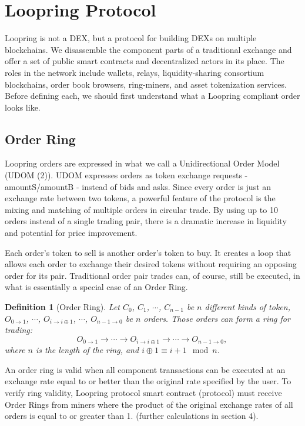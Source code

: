 \documentclass[UTF8,nofonts]{article}
\newtheorem{definition}{Definition}[section]
\begin{document}
\section{Loopring Protocol\label{sec:loopring_protocol}}
Loopring is not a DEX, but a protocol for building DEXs on multiple blockchains. We disassemble the component parts of a traditional exchange and offer a set of public smart contracts and decentralized actors in its place. The roles in the network include wallets, relays, liquidity-sharing consortium blockchains, order book browsers, ring-miners, and asset tokenization services. Before defining each, we should first understand what a Loopring compliant order looks like. 

\subsection{Order Ring}
Loopring orders are expressed in what we call a Unidirectional Order Model (UDOM (2)). UDOM expresses orders as token exchange requests - amountS/amountB - instead of bids and asks. Since every order is just an exchange rate between two tokens, a powerful feature of the protocol is the mixing and matching of multiple orders in circular trade. By using up to 10 orders instead of a single trading pair, there is a dramatic increase in liquidity and potential for price improvement. 

Each order's token to sell is another order's token to buy. It creates a loop that allows each order to exchange their desired tokens without requiring an opposing order for its pair. Traditional order pair trades can, of course, still be executed, in what is essentially a special case of an Order Ring. 


\begin{definition}[Order Ring] Let $C_{0}$, $C_{1}$, $\cdots$, $C_{n-1}$ be $n$ different kinds of token, $O_{0\rightarrow 1}$, $\cdots$, $O_{i\rightarrow i\oplus 1}$, $\cdots$, $O_{n-1 \rightarrow 0}$ be $n$ orders. Those orders can form a ring for trading:
$$O_{0\rightarrow 1} \rightarrow \cdots \rightarrow O_{i\rightarrow i\oplus 1} \rightarrow \cdots \rightarrow O_{n-1\rightarrow 0} \text{, }$$
where $n$ is the length of the ring, and $i\oplus 1 \equiv i+1 \mod n$.
\end{definition}

An order ring is valid when all component transactions can be executed at an exchange rate equal to or better than the original rate specified by the user. To verify ring validity, Loopring protocol smart contract (protocol) must receive Order Rings from miners where the product of the original exchange rates of all orders is equal to or greater than 1. (further calculations in section 4).
\end{document}
